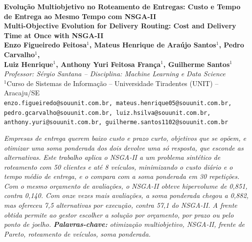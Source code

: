 \documentclass[a4paper,12pt]{article}
\newenvironment{resumo}{%
  \list{}{\advance\topsep by6pt\relax
    \leftmargin=0.8cm
    \labelwidth=0pt
    \listparindent=0pt
    \itemindent\listparindent
    \rightmargin\leftmargin}\item[\hskip\labelsep\bfseries\itshape Resumo.]\itshape}%
  {\endlist}
\begin{document}
\pagestyle{empty}
\begin{center}
  {\fontsize{16}{20}\selectfont\bfseries Evolução Multiobjetivo no Roteamento de Entregas: Custo e Tempo de Entrega ao Mesmo Tempo com NSGA-II}\\[4pt]
  {\fontsize{14}{18}\selectfont\bfseries Multi-Objective Evolution for Delivery Routing: Cost and Delivery Time at Once with NSGA-II}\\[12pt]
  {\normalsize\bfseries Enzo Figueiredo Feitosa$^{1}$, Mateus Henrique de Araújo Santos$^{1}$, Pedro Carvalho$^{1}$,\\ Luiz Henrique$^{1}$, Anthony Yuri Feitosa França$^{1}$, Guilherme Santos$^{1}$}\\[6pt]
  {\footnotesize\itshape Professor: Sérgio Santana -- Disciplina: Machine Learning e Data Science}\\[4pt]
  {\normalsize
    $^{1}$Curso de Sistemas de Informação -- Universidade Tiradentes (UNIT) -- Aracaju/SE\\{}
    \footnotesize\texttt{enzo.figueiredo@souunit.com.br, mateus.henrique05@souunit.com.br,\\
    pedro.gcarvalho@souunit.com.br, luiz.hsilva@souunit.com.br,\\
    anthony.yuri@souunit.com.br, guilherme.santos1102@souunit.com.br}
  }
\end{center}
\vspace{12pt}
\begin{resumo}
Empresas de entrega querem baixo custo e prazo curto, objetivos que se opõem, e otimizar uma soma ponderada dos dois devolve uma só resposta, que esconde as alternativas. Este trabalho aplica o NSGA-II a um problema sintético de roteamento com 50 clientes e até 8 veículos, minimizando o custo diário e o tempo médio de entrega, e o compara com a soma ponderada em 30 repetições. Com o mesmo orçamento de avaliações, o NSGA-II obteve hipervolume de 0,851, contra 0,140. Com onze vezes mais avaliações, a soma ponderada chegou a 0,882, mas ofereceu 7,5 alternativas por execução, contra 57,1 do NSGA-II. A frente obtida permite ao gestor escolher a solução por orçamento, por prazo ou pelo ponto de joelho.
\end{resumo}
\noindent\textbf{Palavras-chave:} otimização multiobjetivo, NSGA-II, frente de Pareto, roteamento de veículos, soma ponderada.

\vspace{6pt}
\end{document}
